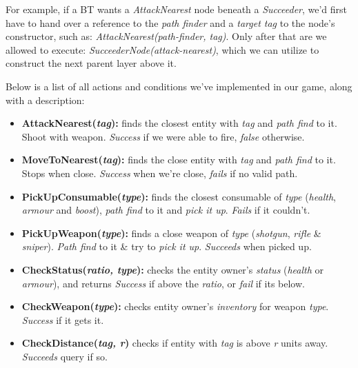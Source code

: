 \documentclass[a4paper, twocolumn]{article}
\begin{document}
        For example, if a BT wants a \emph{AttackNearest} node beneath a \emph{Succeeder}, we'd first have to hand over a reference to the \emph{path finder} and a \emph{target tag} to the node's constructor, such as: \emph{AttackNearest(path-finder, tag)}. Only after that are we allowed to execute: \emph{SucceederNode(attack-nearest)}, which we can utilize to construct the next parent layer above it.

        Below is a list of all actions and conditions we've implemented in our game, along with a description:

        \begin{itemize}
            \item{\textbf{AttackNearest(\emph{tag}):} finds the closest entity with \emph{tag} and \emph{path find} to it. Shoot with weapon. \emph{Success} if we were able to fire, \emph{false} otherwise.}
            \item{\textbf{MoveToNearest(\emph{tag}):} finds the close entity with \emph{tag} and \emph{path find} to it. Stops when close. \emph{Success} when we're close, \emph{fails} if no valid path.}
            \item{\textbf{PickUpConsumable(\emph{type}):} finds the closest consumable of \emph{type} (\emph{health}, \emph{armour} and \emph{boost}), \emph{path find} to it and \emph{pick it up}. \emph{Fails} if it couldn't.}
            \item{\textbf{PickUpWeapon(\emph{type}):} finds a close weapon of \emph{type} (\emph{shotgun}, \emph{rifle} \& \emph{sniper}). \emph{Path find} to it \& try to \emph{pick it up}. \emph{Succeeds} when picked up.}
        \end{itemize}
        \begin{itemize}
            \item{\textbf{CheckStatus(\emph{ratio, type}):} checks the entity owner's \emph{status} (\emph{health} or \emph{armour}), and returns \emph{Success} if above the \emph{ratio}, or \emph{fail} if its below.}
            \item{\textbf{CheckWeapon(\emph{type}):} checks entity owner's \emph{inventory} for weapon \emph{type}. \emph{Success} if it gets it.}
            \item{\textbf{CheckDistance(\emph{tag, r})} checks if entity with \emph{tag} is above \emph{r} units away. \emph{Succeeds} query if so.}
        \end{itemize}

        \clearpage
\end{document}
